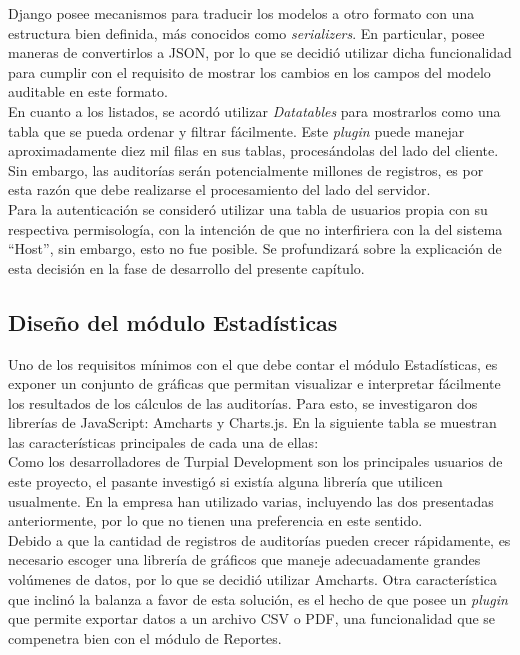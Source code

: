 Django posee mecanismos para traducir los modelos a otro formato con una estructura bien definida, más conocidos como \textit{serializers}. En particular, posee maneras de convertirlos a JSON, por lo que se decidió utilizar dicha funcionalidad para cumplir con el requisito de mostrar los cambios en los campos del modelo auditable en este formato.\\

En cuanto a los listados, se acordó utilizar \textit{Datatables} para mostrarlos como una tabla que se pueda ordenar y filtrar fácilmente. Este \textit{plugin} puede manejar aproximadamente diez mil filas en sus tablas, procesándolas del lado del cliente. Sin embargo, las auditorías serán potencialmente millones de registros, es por esta razón que debe realizarse el procesamiento del lado del servidor.  \\

Para la autenticación se consideró utilizar una tabla de usuarios propia con su respectiva permisología, con la intención de que no interfiriera con la del sistema “Host”, sin embargo, esto no fue posible. Se profundizará sobre la explicación de esta decisión en la fase de desarrollo del presente capítulo.

\subsection{Diseño del módulo Estadísticas}

Uno de los requisitos mínimos con el que debe contar el módulo Estadísticas, es exponer un conjunto de gráficas que permitan visualizar e interpretar fácilmente los resultados de los cálculos de las auditorías. Para esto, se investigaron dos librerías de JavaScript: Amcharts y Charts.js. En la siguiente tabla se muestran las características principales de cada una de ellas:\\



Como los desarrolladores de Turpial Development son los principales usuarios de este proyecto, el pasante investigó si existía alguna librería que utilicen usualmente. En la empresa han utilizado varias, incluyendo las dos presentadas anteriormente, por lo que no tienen una preferencia en este sentido. \\

Debido a que la cantidad de registros de auditorías pueden crecer rápidamente, es necesario escoger una librería de gráficos que maneje adecuadamente grandes volúmenes de datos, por lo que se decidió utilizar Amcharts. Otra característica que inclinó la balanza a favor de esta solución, es el hecho de que posee un \textit{plugin} que permite exportar datos a un archivo CSV o PDF, una funcionalidad que se compenetra bien con el módulo de Reportes. \\

